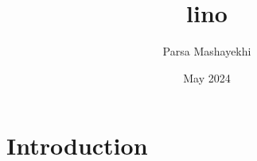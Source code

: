 \documentclass{article}
\title{lino}
\author{Parsa Mashayekhi}
\date{May 2024}
\begin{document}
\maketitle

\section{Introduction}
\end{document}
